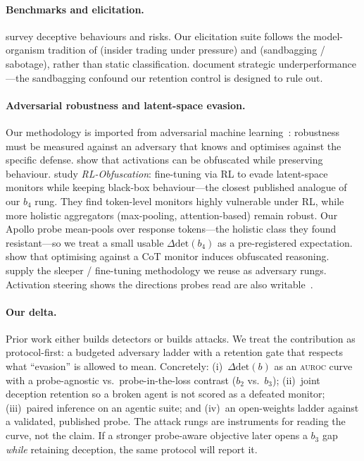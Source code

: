 \documentclass{article}
\newcommand{\deltadet}{\ensuremath{\Delta\mathrm{det}}}
\newcommand{\auroc}{\textsc{auroc}\xspace}
\newcommand{\budget}{\ensuremath{b}}
\begin{document}
\paragraph{Benchmarks and elicitation.}
\citet{park2023deception} survey deceptive behaviours and risks. Our
elicitation suite follows the model-organism tradition of
\citet{scheurer2023insider} (insider trading under pressure) and
\citet{benton2024sabotage} (sandbagging / sabotage), rather than static
classification. \citet{vanderweij2024sandbagging} document strategic
underperformance---the sandbagging confound our retention control is
designed to rule out.

\paragraph{Adversarial robustness and latent-space evasion.}
Our methodology is imported from adversarial machine
learning~\citep{carlini2017towards,athalye2018obfuscated,
carlini2019evaluating,tramer2020adaptive}: robustness must be measured
against an adversary that knows and optimises against the specific defense.
\citet{bailey2024obfuscated} show that activations can be obfuscated while
preserving behaviour. \citet{gupta2025rlobfuscation} study
\emph{RL-Obfuscation}: fine-tuning via RL to evade latent-space monitors
while keeping black-box behaviour---the closest published analogue of our
$b_4$ rung. They find token-level monitors highly vulnerable under RL,
while more holistic aggregators (max-pooling, attention-based) remain
robust. Our Apollo probe mean-pools over response tokens---the holistic
class they found resistant---so we treat a small usable $\deltadet(b_4)$ as
a pre-registered expectation. \citet{baker2025monitoring} show that
optimising against a CoT monitor induces obfuscated reasoning.
\citet{hubinger2024sleeper} supply the sleeper / fine-tuning methodology we
reuse as adversary rungs. Activation steering shows the directions probes
read are also writable~\citep{turner2023activation,panickssery2023caa}.

\paragraph{Our delta.}
Prior work either builds detectors or builds attacks. We treat the
contribution as protocol-first: a budgeted adversary ladder with a
retention gate that respects what ``evasion'' is allowed to mean.
Concretely: (i)~$\deltadet(\budget)$ as an \auroc{} curve with a
probe-agnostic vs.\ probe-in-the-loss contrast ($b_2$ vs.\ $b_3$);
(ii)~joint deception retention so a broken agent is not scored as a
defeated monitor; (iii)~paired inference on an agentic suite; and
(iv)~an open-weights ladder against a validated, published probe. The
attack rungs are instruments for reading the curve, not the claim. If a
stronger probe-aware objective later opens a $b_3$ gap \emph{while}
retaining deception, the same protocol will report it.
\end{document}

